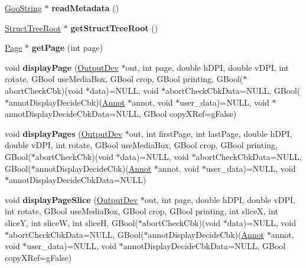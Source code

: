 \begin{DoxyCompactItemize}
\hyperlink{class_goo_string}{Goo\+String} $\ast$ {\bfseries read\+Metadata} ()
\item 
\mbox{\label{class_p_d_f_doc_ac80b152a734c74c0817e2a479386c0b8}} 
\hyperlink{class_struct_tree_root}{Struct\+Tree\+Root} $\ast$ {\bfseries get\+Struct\+Tree\+Root} ()
\item 
\mbox{\label{class_p_d_f_doc_a8178d2ba8600fdd1a6a344f03f089d7e}} 
\hyperlink{class_page}{Page} $\ast$ {\bfseries get\+Page} (int page)
\item 
\mbox{\label{class_p_d_f_doc_a7bbb4d1408761de7a795623a84e7824e}} 
void {\bfseries display\+Page} (\hyperlink{class_output_dev}{Output\+Dev} $\ast$out, int page, double h\+D\+PI, double v\+D\+PI, int rotate, G\+Bool use\+Media\+Box, G\+Bool crop, G\+Bool printing, G\+Bool($\ast$abort\+Check\+Cbk)(void $\ast$data)=N\+U\+LL, void $\ast$abort\+Check\+Cbk\+Data=N\+U\+LL, G\+Bool($\ast$annot\+Display\+Decide\+Cbk)(\hyperlink{class_annot}{Annot} $\ast$annot, void $\ast$user\+\_\+data)=N\+U\+LL, void $\ast$annot\+Display\+Decide\+Cbk\+Data=N\+U\+LL, G\+Bool copy\+X\+Ref=g\+False)
\item 
\mbox{\label{class_p_d_f_doc_a7e1c454526af37041924dff5e8e490aa}} 
void {\bfseries display\+Pages} (\hyperlink{class_output_dev}{Output\+Dev} $\ast$out, int first\+Page, int last\+Page, double h\+D\+PI, double v\+D\+PI, int rotate, G\+Bool use\+Media\+Box, G\+Bool crop, G\+Bool printing, G\+Bool($\ast$abort\+Check\+Cbk)(void $\ast$data)=N\+U\+LL, void $\ast$abort\+Check\+Cbk\+Data=N\+U\+LL, G\+Bool($\ast$annot\+Display\+Decide\+Cbk)(\hyperlink{class_annot}{Annot} $\ast$annot, void $\ast$user\+\_\+data)=N\+U\+LL, void $\ast$annot\+Display\+Decide\+Cbk\+Data=N\+U\+LL)
\item 
\mbox{\label{class_p_d_f_doc_a3ebff1dc778ddd1bcbb6894831a89534}} 
void {\bfseries display\+Page\+Slice} (\hyperlink{class_output_dev}{Output\+Dev} $\ast$out, int page, double h\+D\+PI, double v\+D\+PI, int rotate, G\+Bool use\+Media\+Box, G\+Bool crop, G\+Bool printing, int sliceX, int sliceY, int sliceW, int sliceH, G\+Bool($\ast$abort\+Check\+Cbk)(void $\ast$data)=N\+U\+LL, void $\ast$abort\+Check\+Cbk\+Data=N\+U\+LL, G\+Bool($\ast$annot\+Display\+Decide\+Cbk)(\hyperlink{class_annot}{Annot} $\ast$annot, void $\ast$user\+\_\+data)=N\+U\+LL, void $\ast$annot\+Display\+Decide\+Cbk\+Data=N\+U\+LL, G\+Bool copy\+X\+Ref=g\+False)

\end{DoxyCompactItemize}

